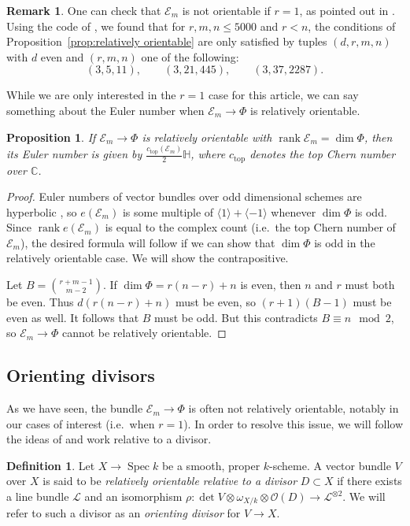 \documentclass[12pt]{amsart}
\numberwithin{equation}{section}
\theoremstyle{plain}
\newtheorem{prop}[thm]{Proposition}
\theoremstyle{definition}
\newtheorem{defn}[thm]{Definition}
\newtheorem{rem}[thm]{Remark}
\newcommand{\mb}[1]{\mathbb{#1}}
\newcommand{\mc}[1]{\mathcal{#1}}
\newcommand{\mr}[1]{\mathrm{#1}}
\newcommand{\Spec}{\operatorname{Spec}}
\newcommand{\rank}{\operatorname{rank}}
\begin{document}
\begin{rem}
One can check that $\mc{E}_m$ is not orientable if $r=1$, as pointed out in \cite[Remark~6.4]{osculating}. Using the code of \cite{GabRep}, we found that for $r, m, n\le 5000$ and $r<n$, the conditions of Proposition~\ref{prop:relatively orientable} are only satisfied by tuples $(d, r, m, n)$ with $d$ even and $(r, m, n)$ one of the following:
\[(3, 5, 11),\qquad(3, 21, 445),\qquad(3, 37, 2287).\]
\end{rem}

While we are only interested in the $r=1$ case for this article, we can say something about the Euler number when $\mc{E}_m\to\Phi$ is relatively orientable.

\begin{prop}
    If $\mc{E}_m\to\Phi$ is relatively orientable with $\rank\mc{E}_m=\dim\Phi$, then its Euler number is given by $\frac{c_\mr{top}(\mc{E}_m)}{2}\mb{H}$, where $c_\mr{top}$ denotes the top Chern number over $\mb{C}$.
\end{prop}
\begin{proof}
    Euler numbers of vector bundles over odd dimensional schemes are hyperbolic \cite[Proposition 19]{FourLines}, so $e(\mc{E}_m)$ is some multiple of $\langle 1\rangle+\langle -1\rangle$ whenever $\dim\Phi$ is odd. Since $\rank e(\mc{E}_m)$ is equal to the complex count (i.e.~the top Chern number of $\mc{E}_m$), the desired formula will follow if we can show that $\dim\Phi$ is odd in the relatively orientable case. We will show the contrapositive. 
    
    Let $B=\binom{r+m-1}{m-2}$. If $\dim\Phi=r(n-r)+n$ is even, then $n$ and $r$ must both be even. Thus $d(r(n-r)+n)$ must be even, so $(r+1)(B-1)$ must be even as well. It follows that $B$ must be odd. But this contradicts $B\equiv n\mod 2$, so $\mc{E}_m\to\Phi$ cannot be relatively orientable.
\end{proof}

\subsection{Orienting divisors}\label{sec:orienting divisors}
As we have seen, the bundle $\mc{E}_m\to\Phi$ is often not relatively orientable, notably in our cases of interest (i.e.~when $r=1$). In order to resolve this issue, we will follow the ideas of \cite{LV21} and work relative to a divisor.

\begin{defn}\label{defn:orientable_relative}
    Let $X\to\Spec{k}$ be a smooth, proper $k$-scheme. A vector bundle $V$ over $X$ is said to be \emph{relatively orientable relative to a divisor} $D\subset X$ if there exists a line bundle $\mc{L}$ and an isomorphism  $\rho\colon \det V\otimes\omega_{X/k}\otimes\mc{O}(D)\to\mc{L}^{\otimes 2}$. We will refer to such a divisor as an \emph{orienting divisor} for $V\to X$.
\end{defn}
\end{document}
